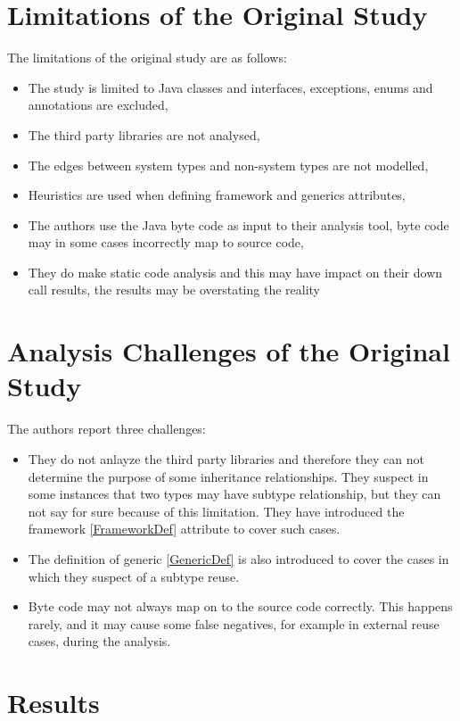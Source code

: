 \documentclass{uvamscse}
\begin{document}
\section{Limitations of the Original Study}
The limitations of the original study are as follows: 
\begin{itemize}
\item The study is limited to Java classes and interfaces, exceptions, enums and annotations are excluded,
\item The third party libraries are not analysed,
\item The edges between system types and non-system types are not modelled,
\item Heuristics are used when defining framework and generics attributes,
\item The authors use the Java byte code as input to their analysis tool, byte code may in some cases incorrectly map to source code,
\item They do make static code analysis and this may have impact on their down call results, the results may be overstating the reality
\end{itemize}


\section{Analysis Challenges of the Original Study} \label{OriginalChallenges}

The authors report three challenges:
\begin{itemize}
\item They do not anlayze the third party libraries and therefore they can not determine the purpose of some inheritance relationships. They suspect in some instances that two types may have subtype relationship, but they can not say for sure because of this limitation. They have introduced the framework \ref{FrameworkDef} attribute to cover such cases. 
\item The definition of generic \ref{GenericDef} is also introduced to cover the cases in which they suspect of a subtype reuse. 
\item Byte code may not always map on to the source code correctly. This happens rarely, and it may cause some false negatives, for example in external reuse cases, during the analysis.
\end{itemize}



\section{Results} \label{OriginalResults}
\end{document}
